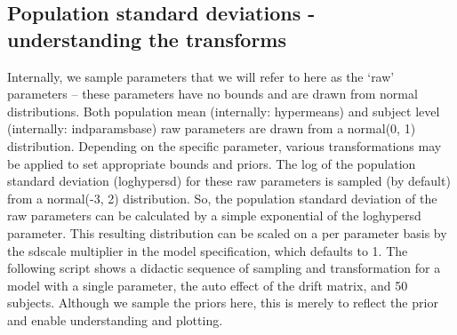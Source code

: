 \documentclass[nojss]{jss}\usepackage[]{graphicx}\usepackage[]{color}
\begin{document}
\subsection{Population standard deviations - understanding the transforms}
Internally, we sample parameters that we will refer to here as the `raw' parameters -- these parameters have no bounds and are drawn from normal distributions. Both population mean (internally: hypermeans) and subject level (internally: indparamsbase) raw parameters are drawn from a normal(0, 1) distribution. Depending on the specific parameter, various transformations may be applied to set appropriate bounds and priors. The log of the population standard deviation (loghypersd) for these raw parameters is sampled (by default) from a normal(-3, 2) distribution. So, the population standard deviation of the raw parameters can be calculated by a simple exponential of the loghypersd parameter. This resulting distribution can be scaled on a per parameter basis by the sdscale multiplier in the model specification, which defaults to 1. The following script shows a didactic sequence of sampling and transformation for a model with a single parameter, the auto effect of the drift matrix, and 50 subjects. Although we sample the priors here, this is merely to reflect the prior and enable understanding and plotting.
\end{document}
